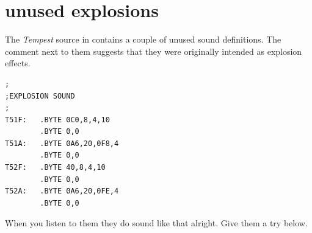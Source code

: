\chapter{unused explosions}
\label{sec:cursor_crossed_a_line}
\lhead[tempest]{}
\lstset{style=6502Style}

The \textit{Tempest} source in  contains a couple of unused sound definitions.
The comment next to them suggests that they were originally intended as explosion effects.
\begin{lstlisting}
;
;EXPLOSION SOUND
;
T51F:   .BYTE 0C0,8,4,10
        .BYTE 0,0
T51A:   .BYTE 0A6,20,0F8,4
        .BYTE 0,0
T52F:   .BYTE 40,8,4,10
        .BYTE 0,0
T52A:   .BYTE 0A6,20,0FE,4
        .BYTE 0,0
\end{lstlisting}

When you listen to them they do sound like that alright. Give them a try below.

